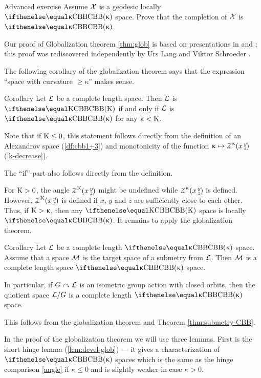\begin{thm}{Advanced exercise}\label{ex:noncomplete-globalization}
Assume $\mathcal{X}$ is a geodesic locally  $\Alex\kappa$ space. 
Prove that the completion of $\mathcal{X}$ is $\Alex\kappa$.
\end{thm}

Our proof of Globalization theorem \ref{thm:glob} is based on presentations in \cite{plaut:dimension} and \cite{burago-burago-ivanov};
this proof was rediscovered independently by Urs Lang and Viktor Schroeder \cite{lang-schroeder:globalization}.

The following corollary of the globalization  theorem says that the expression ``space with curvature $\ge \kappa$'' makes sense.

\begin{thm}{Corollary}\label{cor:CAT>k-sence}
Let $\mathcal{L}$ be a complete length space.
Then $\mathcal{L}$ is $\Alex\Kappa$ if and only if $\mathcal{L}$ is $\Alex\kappa$ for any $\upkappa<\mathrm{K}$.
\end{thm}

Note that if $\Kappa\le 0$, this statement follows directly from the  definition of an Alexandrov space (\ref{df:cbb1+3}) and monotonicity of the function $\kappa\mapsto\angk\kappa x y z$ (\ref{k-decrease}).

The ``if''-part also follows directly from the definition.

For $\mathrm{K}>0$, the angle $\angk{\Kappa} x y z$ might be undefined while $\angk{\kappa} x y z$ is defined.
However, $\angk{\Kappa} x y z$ is defined if $x$, $y$ and $z$ are sufficiently close to each other.
Thus, if $\mathrm{K}>\upkappa$, then any $\Alex\Kappa$ space is locally $\Alex\kappa$.
It remains to apply the  globalization theorem.
\qeds

\begin{thm}{Corollary}\label{cor:submetry-cbb}
Let $\mathcal{L}$ be a complete length $\Alex\kappa$ space.
Assume that a space  $\mathcal{M}$ is the target space of a submetry from $\mathcal{L}$.
Then $\mathcal{M}$ is a complete length space $\Alex\kappa$ space.

In particular, if $G\curvearrowright \mathcal{L}$ is an isometric group action with closed orbits, then the quotient space $\mathcal{L}/G$ is a complete length $\Alex\kappa$ space.
\end{thm}

This follows from the globalization theorem and Theorem \ref{thm:submetry-CBB}.
\qeds

In the proof of the globalization theorem 
we will use three lemmas.
First is the short hinge lemma (\ref{lem:devel-glob}) --- it gives a characterization of $\Alex\kappa$ spaces which is the same as the hinge comparison \ref{angle} if $\kappa\le 0$ and is slightly weaker in case $\kappa>0$.

